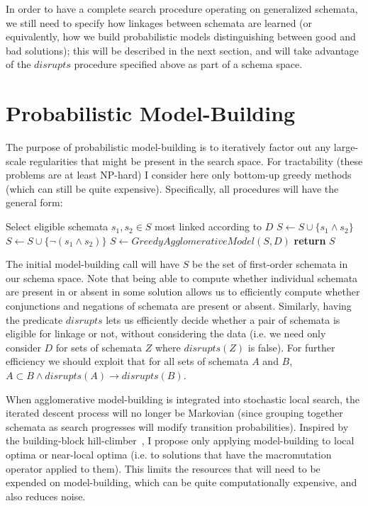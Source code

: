 \documentclass[letterpaper]{article}
\begin{document}
In order to have a complete search procedure operating on generalized schemata,
we still need to specify how linkages between schemata are learned (or
equivalently, how we build probabilistic models distinguishing between good and
bad solutions); this will be described in the next section, and will take
advantage of the $disrupts$ procedure specified above as part of a schema
space.

\section{Probabilistic Model-Building}

The purpose of probabilistic model-building is to iteratively factor out any
large-scale regularities that might be present in the search space. For
tractability (these problems are at least NP-hard) I consider here only
bottom-up greedy methods (which can still be quite expensive). Specifically,
all procedures will have the general form:

\begin{algorithmic}
  \State Select eligible schemata $s_1,s_2 \in S$ most linked according to $D$
    \State $S \leftarrow S \cup \{s_1 \wedge s_2\}$
  \EndIf
    \State $S \leftarrow S \cup \{\neg (s_1 \wedge s_2)\}$
  \EndIf
    \State $S \leftarrow GreedyAgglomerativeModel(S,D)$
  \EndIf
  \State \textbf{return} $S$
\EndProcedure
\end{algorithmic}

The initial model-building call will have $S$ be the set of first-order
schemata in our schema space. Note that being able to compute whether
individual schemata are present in or absent in some solution allows us to
efficiently compute whether conjunctions and negations of schemata are present
or absent. Similarly, having the predicate $disrupts$ lets us efficiently
decide whether a pair of schemata is eligible for linkage or not, without
considering the data (i.e. we need only consider $D$ for sets of schemata $Z$
where $disrupts(Z)$ is false). For further efficiency we should exploit that
for all sets of schemata $A$ and $B$, $A \subset B \wedge disrupts(A)
\rightarrow disrupts(B)$.

When agglomerative model-building is integrated into stochastic local search,
the iterated descent process will no longer be Markovian (since grouping
together schemata as search progresses will modify transition
probabilities). Inspired by the building-block hill-climber~\cite{Iclanzan}, I
propose only applying model-building to local optima or near-local optima
(i.e. to solutions that have the macromutation operator applied to them). This
limits the resources that will need to be expended on model-building, which can
be quite computationally expensive, and also reduces noise.
\end{document}
